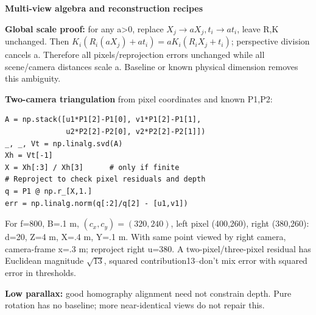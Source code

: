 \documentclass[a4paper]{article}
\newcommand{\key}[1]{\textbf{#1}}
\newcommand{\Topic}[1]{\par\vspace{1.7pt}\noindent
  {\fontsize{7.7}{8.0}\selectfont\bfseries #1}\par\vspace{0.3pt}}
\newcounter{sheet}
\newcounter{sheetcolumn}
\newlength{\colwidth}
\newcommand{\EndSheet}{\unskip\egroup\par}
\newenvironment{sheetcol}[1][7.0]{\stepcounter{sheetcolumn}
  \begin{lrbox}{\columnbox}\begin{minipage}[t]{\colwidth}\vspace{0pt}
  \fontsize{#1}{\dimexpr#1pt+0.6pt\relax}\selectfont}
  {\end{minipage}\end{lrbox}
  \typeout{CV1COL|\thesheet|\thesheetcolumn|\the\dimexpr\ht\columnbox+\dp\columnbox\relax}
  \usebox{\columnbox}\ignorespacesafterend}
\begin{document}
\begin{sheetcol}
\Topic{Multi-view algebra and reconstruction recipes}
\key{Global scale proof:} for any a>0, replace \(X_j\to aX_j,t_i\to at_i\), leave R,K unchanged. Then \(K_i(R_i(aX_j)+at_i)=aK_i(R_iX_j+t_i)\); perspective division cancels a. Therefore all pixels/reprojection errors unchanged while all scene/camera distances scale a. Baseline or known physical dimension removes this ambiguity.

\key{Two-camera triangulation} from pixel coordinates and known P1,P2:
\begin{lstlisting}
A = np.stack([u1*P1[2]-P1[0], v1*P1[2]-P1[1],
              u2*P2[2]-P2[0], v2*P2[2]-P2[1]])
_, _, Vt = np.linalg.svd(A)
Xh = Vt[-1]
X = Xh[:3] / Xh[3]      # only if finite
# Reproject to check pixel residuals and depth
q = P1 @ np.r_[X,1.]
err = np.linalg.norm(q[:2]/q[2] - [u1,v1])
\end{lstlisting}
For f=800, B=.1 m, \((c_x,c_y)=(320,240)\), left pixel (400,260), right (380,260): d=20, Z=4 m, X=.4 m, Y=.1 m. With same point viewed by right camera, camera-frame x=.3 m; reproject right u=380. A two-pixel/three-pixel residual has Euclidean magnitude \(\sqrt{13}\), squared contribution13--don't mix error with squared error in thresholds.

\key{Low parallax:} good homography alignment need not constrain depth. Pure rotation has no baseline; more near-identical views do not repair this.

\end{sheetcol}\EndSheet
\end{document}

